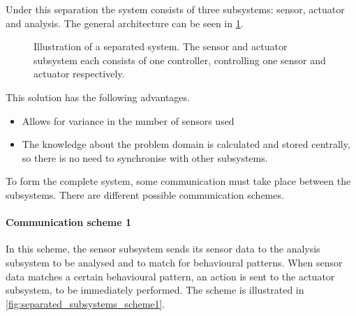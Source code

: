 Under this separation the system consists of three subsystems: sensor, actuator and analysis.  The general architecture can be seen in \cref{fig:separated_subsystems}.

\begin{figure}[htbp]
\centering
{}
\caption[Separated system]{Illustration of a separated system. The sensor and actuator subsystem each consists of one controller, controlling one sensor and actuator respectively.}\label{fig:separated_subsystems}
\end{figure}

This solution has the following advantages.

\begin{itemize}
  \item Allows for variance in the number of sensors used
  \item The knowledge about the problem domain is calculated and stored centrally, so there is no need to synchronise with other subsystems.
\end{itemize}

To form the complete system, some communication must take place between the subsystems. There are different possible communication schemes.

\paragraph{Communication scheme 1}

In this scheme, the sensor subsystem sends its sensor data to the analysis subsystem to be analysed and to match for behavioural patterns. When sensor data matches a certain behavioural pattern, an action is sent to the actuator subsystem, to be immediately performed. The scheme is illustrated in \cref{fig:separated_subsystems_scheme1}.

